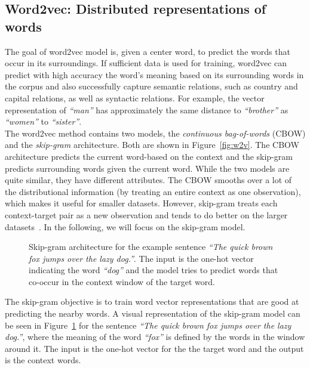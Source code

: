 \subsection{Word2vec: Distributed representations of words}
\label{subsec:word2vec}
The goal of word2vec model is, given a center word, to predict the words that occur in its surroundings. If sufficient data is used for training, word2vec can predict with high accuracy the word's meaning based on its surrounding words in the corpus and also successfully capture semantic relations, such as country and capital relations, as well as syntactic relations. For example, the vector representation of  \emph{``man''} has approximately the same distance to \emph{``brother''} as \emph{``women''} to \emph{``sister''}. \\
The word2vec method contains two models, the \emph{continuous bag-of-words} (CBOW) and the \emph{skip-gram} architecture. Both are shown in Figure~\ref{fig:w2v}. The CBOW architecture predicts the current word-based on the context and the skip-gram predicts surrounding words given the current word. While the two models are quite similar, they have different attributes. The CBOW smooths over a lot of the distributional information (by treating an entire context as one observation), which makes it useful for smaller datasets. However, skip-gram treats each context-target pair as a new observation and tends to do better on the larger datasets~. In the following, we will focus on the skip-gram model. \\
\begin{figure}
\centering 
\resizebox{0.8\textwidth}{0.5\textwidth}{      

}
\caption{Skip-gram architecture for the example sentence \emph{``The quick brown fox jumps over the lazy dog.''}. The input is the one-hot vector indicating the word \emph{``dog''} and the model tries to predict words that co-occur in the context window of the target word.  }
\label{fig:skip_w2v}
\end{figure}
\noindent
The skip-gram objective is to train word vector representations that are good at predicting the nearby words. A visual representation of the skip-gram model can be seen in Figure~\ref{fig:skip_w2v} for the sentence \emph{``The quick brown fox jumps over the lazy dog.''}, where the meaning of the word \emph{``fox''} is defined by the words in the window around it. The input is the one-hot vector for the the target word and the output is the context words.\\
